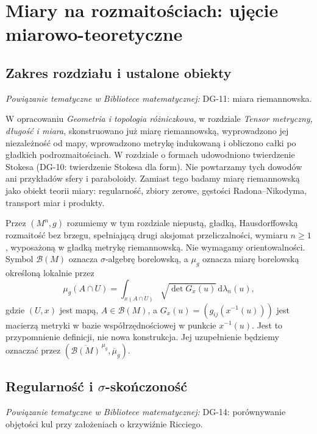 \chapter[Miary na rozmaitościach]{Miary na rozmaitościach: ujęcie miarowo-teoretyczne}
\label{ch:miary-rozmaitosci-27}

\providecommand{\atlasref}[2]{#2}


\section{Zakres rozdziału i ustalone obiekty}

\noindent\emph{Powiązanie tematyczne w Bibliotece matematycznej:} \atlasref{DG-11::def:miara-riemannowska}{DG-11: miara riemannowska}.

W opracowaniu \emph{Geometria i topologia różniczkowa}, w rozdziale
\emph{Tensor metryczny, długość i miara}, skonstruowano już
miarę riemannowską, wyprowadzono jej niezależność od mapy,
wprowadzono metrykę indukowaną i obliczono całki po gładkich
podrozmaitościach. W rozdziale o formach udowodniono twierdzenie
Stokesa (\atlasref{DG-10::thm:stokes-formy}{DG-10: twierdzenie Stokesa dla form}). Nie powtarzamy tych dowodów ani przykładów
sfery i paraboloidy. Zamiast tego badamy miarę riemannowską
jako obiekt teorii miary: regularność, zbiory zerowe,
gęstości Radona--Nikodyma, transport miar i produkty.

Przez $(M^n,g)$ rozumiemy w tym rozdziale niepustą, gładką,
Hausdorffowską rozmaitość bez brzegu, spełniającą drugi aksjomat przeliczalności,
wymiaru $n\ge1$, wyposażoną w gładką metrykę riemannowską.
Nie wymagamy orientowalności. Symbol $\mathcal B(M)$ oznacza
$\sigma$-algebrę borelowską, a $\mu_g$ oznacza miarę
borelowską określoną lokalnie przez
\begin{equation}\label{eq:g-density-27}
  \mu_g(A\cap U)=\int_{x(A\cap U)}
  \sqrt{\det G_x(u)}\,\mathrm d\lambda_n(u),
\end{equation}
gdzie $(U,x)$ jest mapą, $A\in\mathcal B(M)$,
a $G_x(u)=(g_{ij}(x^{-1}(u)))$ jest macierzą metryki
w bazie współrzędnościowej w punkcie $x^{-1}(u)$.
Jest to przypomnienie definicji, nie nowa konstrukcja.
Jej uzupełnienie będziemy oznaczać przez
$(\overline{\mathcal B(M)}^{\,\mu_g},\overline\mu_g)$.

\section{Regularność i \texorpdfstring{$\sigma$}{σ}-skończoność}
\noindent\emph{Powiązanie tematyczne w Bibliotece matematycznej:} \atlasref{DG-14::thm:bishop-gromov}{DG-14: porównywanie objętości kul przy założeniach o krzywiźnie Ricciego}.


